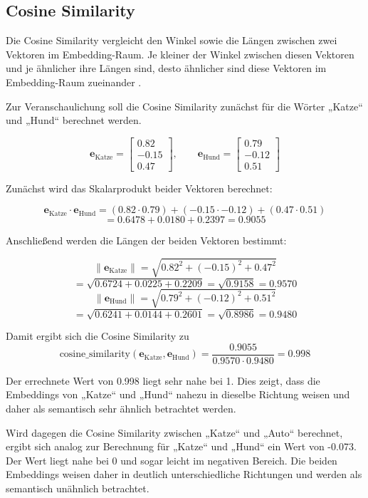 \subsection{Cosine Similarity}
\label{sec:cosine_similarity}

Die Cosine Similarity vergleicht den Winkel sowie die Längen zwischen zwei Vektoren im Embedding-Raum. 
Je kleiner der Winkel zwischen diesen Vektoren und je ähnlicher ihre Längen sind, desto ähnlicher sind diese Vektoren im Embedding-Raum zueinander \parencite{Reimers2019SBERT}.

Zur Veranschaulichung soll die Cosine Similarity zunächst für die Wörter „Katze“ und „Hund“ berechnet werden. 

\[ \mathbf{e}_{\text{Katze}} = 
\begin{bmatrix} 0.82\\ -0.15\\ 0.47 
\end{bmatrix} , 
\qquad \mathbf{e}_{\text{Hund}} = 
\begin{bmatrix} 0.79\\ -0.12\\ 0.51 
\end{bmatrix} \] 

Zunächst wird das Skalarprodukt beider Vektoren berechnet: 

\[ \mathbf{e}_{\text{Katze}} 
\cdot 
\mathbf{e}_{\text{Hund}} =
(0.82 \cdot 0.79) + 
(-0.15 \cdot -0.12) + 
(0.47 \cdot 0.51) \] 
\[ = 0.6478 + 0.0180 + 0.2397 = 0.9055 \] 

Anschließend werden die Längen der beiden Vektoren bestimmt: 

\[ \|\mathbf{e}_{\text{Katze}}\| = 
\sqrt{ 0.82^2 + (-0.15)^2 + 0.47^2} \] 
\[ = \sqrt{ 0.6724 + 0.0225 + 0.2209} = 
\sqrt{0.9158} = 0.9570 \] 
\[ \|\mathbf{e}_{\text{Hund}}\| = 
\sqrt{ 0.79^2 + (-0.12)^2 + 0.51^2} \] 
\[ = \sqrt{ 0.6241 + 0.0144 + 0.2601} = 
\sqrt{0.8986} = 0.9480 \] 

Damit ergibt sich die Cosine Similarity zu 
\[ \text{cosine\_similarity} (\mathbf{e}_{\text{Katze}}, 
\mathbf{e}_{\text{Hund}}) = 
\frac{0.9055} {0.9570\cdot0.9480} = 0.998 \] 

Der errechnete Wert von 0.998 liegt sehr nahe bei 1. Dies zeigt, dass die Embeddings von „Katze“ und „Hund“ nahezu in dieselbe Richtung weisen und daher als semantisch sehr ähnlich betrachtet werden.

Wird dagegen die Cosine Similarity zwischen „Katze“ und „Auto“ berechnet, ergibt sich analog zur Berechnung für „Katze“ und „Hund“ ein Wert von -0.073.
Der Wert liegt nahe bei 0 und sogar leicht im negativen Bereich. Die beiden Embeddings weisen daher in deutlich unterschiedliche Richtungen und werden als semantisch unähnlich betrachtet.



